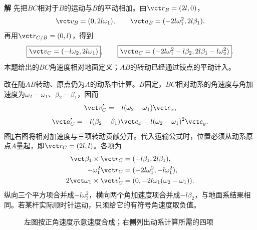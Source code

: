 \documentclass[11pt,openany,fontset=fandol]{ctexbook}
\theoremstyle{definition}\newtheorem{example}{例}[chapter]\newtheorem{exercise}{习题}[chapter]
\newcommand{\SolutionStart}{\par\medskip\ifdim\pagetotal>0pt\ifdim\dimexpr\pagegoal-\pagetotal\relax<3\baselineskip\newpage\fi\fi\noindent\textbf{解}\quad\ignorespaces}
\newenvironment{solution}{\SolutionStart}{\par\medskip}
\begin{document}
\begin{solution}
先把$BC$相对于$B$的运动与$B$的平动相加。由$\vct r_B=(2l,0)$，
\[
 \vct v_B=(0,2l\omega_1),\qquad
 \vct a_B=(-2l\omega_1^2,2l\beta_1).
\]
再用$\vct r_{C/B}=(0,l)$，得到
\[
 \boxed{\vct v_C=(-l\omega_2,2l\omega_1)},
 \qquad
 \boxed{\vct a_C=(-2l\omega_1^2-l\beta_2,
                         2l\beta_1-l\omega_2^2)}.
\]
本题给出的$BC$角速度相对地面定义；$AB$的转动已经通过铰点的平动计入。

改在随$AB$转动、原点仍为$A$的动系中计算。$B$固定，$BC$相对动系的角速度与角加速度为$\omega_2-\omega_1$、$\beta_2-\beta_1$，因而
\[
 \vct v'_C=-l(\omega_2-\omega_1)\vct e_x,
\]
\[
 \vct a'_C=-l(\beta_2-\beta_1)\vct e_x
           -l(\omega_2-\omega_1)^2\vct e_y.
\]
图\ref{mp3:fig:hw:l3-17-s}右图将相对加速度与三项转动贡献分开。代入运输公式时，位置必须从动系原点$A$量起，即$\vct r_C=(2l,l)$。各项为
\[
 \begin{aligned}
 \vct\beta_1\times\vct r_C&=(-l\beta_1,2l\beta_1),\\
 -\omega_1^2\vct r_C&=(-2l\omega_1^2,-l\omega_1^2),\\
 2\vct\omega_1\times\vct v'_C
  &=(0,-2l\omega_1(\omega_2-\omega_1)).
 \end{aligned}
\]
纵向三个平方项合并成$-l\omega_2^2$，横向两个角加速度项合并成$-l\beta_2$，与地面系结果相同。若某杆实际顺时针运动，只须给它的有符号角速度取负值。


\begin{figure}[H]\centering
{}
\caption{左图按正角速度示意速度合成；右侧列出动系计算所需的四项}\label{mp3:fig:hw:l3-17-s}
\end{figure}

\end{solution}
\end{document}
